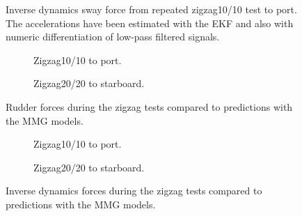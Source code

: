 \begin{figure}[h]
    \centering
    
    \caption{Inverse dynamics sway force from repeated zigzag10/10 test to port. The accelerations have been estimated with the EKF and also with numeric differentiation of low-pass filtered signals.}
    \label{fig:lowpass_deviation_points}
\end{figure}
\begin{figure}[h]
    \centering
    \begin{subfigure}[b]{\textwidth}
        \centering
        
        \caption{Zigzag10/10 to port.}
        \label{fig:ID_measured_rudder_zigzag_10_10}
    \end{subfigure}
     \vfill
    \begin{subfigure}[b]{\textwidth}
        \centering
        
        \caption{Zigzag20/20 to starboard.}
        \label{fig:ID_measured_rudder_zigzag_20_20}
    \end{subfigure}
    \caption{Rudder forces during the zigzag tests compared to predictions with the MMG models.}
    \label{fig:ID_optiwise20}
\end{figure}
\begin{figure}[h]
    \centering
    \begin{subfigure}[b]{\textwidth}
        \centering
        
        \caption{Zigzag10/10 to port.}
        \label{fig:ID_measured_rudder_zigzag_10_10}
    \end{subfigure}
     \vfill
    \begin{subfigure}[b]{\textwidth}
        \centering
        
        \caption{Zigzag20/20 to starboard.}
        \label{fig:ID_measured_rudder_zigzag_20_20}
    \end{subfigure}
    \caption{Inverse dynamics forces during the zigzag tests compared to predictions with the MMG models.}
    \label{fig:ID_optiwise20}
\end{figure}

